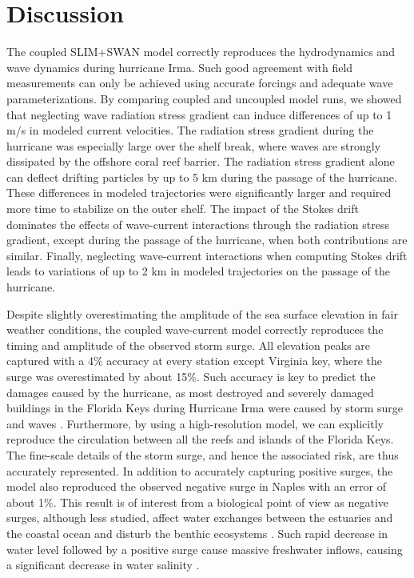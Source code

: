 \documentclass[preprint,12pt,authoryear]{elsarticle}
\begin{document}

\section{Discussion}

The coupled SLIM+SWAN model correctly reproduces the hydrodynamics and wave dynamics during hurricane Irma. Such good agreement with field measurements can only be achieved using accurate forcings and adequate wave parameterizations. By comparing coupled and uncoupled model runs, we showed that neglecting wave radiation stress gradient can induce differences of up to 1 m/s in modeled current velocities. The radiation stress gradient during the hurricane was especially large over the shelf break, where waves are strongly dissipated by the offshore coral reef barrier. The radiation stress gradient alone can deflect drifting particles by up to 5 km during the passage of the hurricane. These differences in modeled trajectories were significantly larger and required more time to stabilize on the outer shelf. The impact of the Stokes drift dominates the effects of wave-current interactions through the radiation stress gradient, except during the passage of the hurricane, when both contributions are similar. Finally, neglecting wave-current interactions when computing Stokes drift leads to variations of up to 2 km in modeled trajectories on the passage of the hurricane.

Despite slightly overestimating the amplitude of the sea surface elevation in fair weather conditions, the coupled wave-current model correctly reproduces the timing and amplitude of the observed storm surge. All elevation peaks are captured with a 4\% accuracy at every station except Virginia key, where the surge was overestimated by about 15\%. Such accuracy is key to predict the damages caused by the hurricane, as most destroyed and severely damaged buildings in the Florida Keys during Hurricane Irma were caused by storm surge and waves \citep{xian2018brief}. Furthermore, by using a high-resolution model, we can explicitly reproduce the circulation between all the reefs and islands of the Florida Keys. The fine-scale details of the storm surge, and hence the associated risk, are thus accurately represented. In addition to accurately capturing positive surges, the model also reproduced the observed negative surge in Naples with an error of about 1\%. This result is of interest from a biological point of view as negative surges, although less studied, affect water exchanges between the estuaries and the coastal ocean and disturb the benthic ecosystems \citep{liu2020impacts}. Such rapid decrease in water level followed by a positive surge cause massive freshwater inflows, causing a significant decrease in water salinity \citep{wachnicka2019hurricane}.
\end{document}
